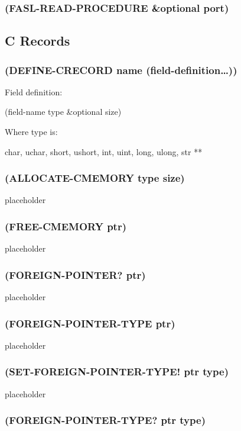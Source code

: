 \documentclass[11pt]{article}
\begin{document}
\subsubsection{(FASL-READ-PROCEDURE \&optional port)}
\label{sec-4-42-3}
\subsection{C Records}
\label{sec-4-43}

\subsubsection{(DEFINE-CRECORD name (field-definition\ldots{}))}
\label{sec-4-43-1}

Field definition:

(field-name type \&optional size)

Where type is:

char, uchar, short, ushort, int, uint, long, ulong,
str **
\subsubsection{(ALLOCATE-CMEMORY type size)}
\label{sec-4-43-2}

placeholder
\subsubsection{(FREE-CMEMORY ptr)}
\label{sec-4-43-3}

placeholder
\subsubsection{(FOREIGN-POINTER? ptr)}
\label{sec-4-43-4}

placeholder
\subsubsection{(FOREIGN-POINTER-TYPE ptr)}
\label{sec-4-43-5}

placeholder
\subsubsection{(SET-FOREIGN-POINTER-TYPE! ptr type)}
\label{sec-4-43-6}

placeholder
\subsubsection{(FOREIGN-POINTER-TYPE? ptr type)}
\label{sec-4-43-7}
\end{document}
